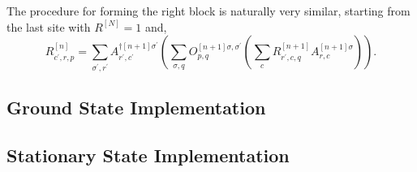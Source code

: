 The procedure for forming the right block is naturally very similar, starting from the last site with \(R^{[N]} = 1\) and,
\begin{equation}
R^{[n]}_{c^{\prime}, r, p} = \sum_{\sigma^{\prime}, r^{\prime}} A^{\dagger [n+1] \sigma^{\prime}}_{r^{\prime}, c^{\prime}} \left( \sum_{\sigma, q} O^{[n+1] \sigma, \sigma^{\prime}}_{p, q} \left( \sum_{c} R^{[n+1]}_{r^{\prime}, c, q} A^{[n+1] \sigma}_{r, c} \right) \right).  
\label{eq:vs1-5}
\end{equation}

 \subsection{Ground State Implementation}
 
 \subsection{Stationary State Implementation}